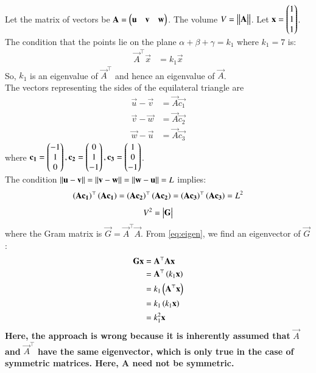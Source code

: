 \documentclass[journal]{IEEEtran}
\begin{document}
Let the matrix of vectors be $\mathbf{A} = \begin{pmatrix}\mathbf{u} & \mathbf{v} & \mathbf{w}\end{pmatrix}$. The volume $V = \left\vert\begin{vmatrix}\mathbf{A}\end{vmatrix}\right\vert$.
Let $\mathbf{x} = \begin{pmatrix}1 \\ 1 \\ 1\end{pmatrix}$. The condition that the points lie on the plane $\alpha+\beta+\gamma=k_1$ where $k_1=7$ is:
\begin{align}
    \vec{A}^\top\vec{x} &= k_1\vec{x} \label{eq:eigen}
\end{align}
So, $k_1$ is an eigenvalue of $\vec{A}^\top$ and hence an eigenvalue of $\vec{A}$. \\
The vectors representing the sides of the equilateral triangle are
\begin{align}
    \vec{u} - \vec{v} &= \vec{A}\vec{c_1} \label{eq:1} \\
    \vec{v} - \vec{w} &= \vec{A}\vec{c_2} \label{eq:2} \\
    \vec{w} - \vec{u} &= \vec{A}\vec{c_3} \label{eq:3}
\end{align}
where $\mathbf{c_1} = \begin{pmatrix}-1 \\ 1 \\ 0\end{pmatrix}, \mathbf{c_2} = \begin{pmatrix}0 \\ 1 \\ -1\end{pmatrix}, \mathbf{c_3} = \begin{pmatrix}1 \\ 0 \\ -1\end{pmatrix}$. \\
The condition $\left\lVert\mathbf{u} - \mathbf{v}\right\rVert = \left\lVert\mathbf{v} - \mathbf{w}\right\rVert = \left\lVert\mathbf{w} - \mathbf{u}\right\rVert = L$ implies:
\begin{align}
    \left(\mathbf{A}\mathbf{c_1}\right)^\top\left(\mathbf{A}\mathbf{c_1}\right) = \left(\mathbf{A}\mathbf{c_2}\right)^\top\left(\mathbf{A}\mathbf{c_2}\right) = \left(\mathbf{A}\mathbf{c_3}\right)^\top\left(\mathbf{A}\mathbf{c_3}\right) = L^2 \label{eq:gram}
\end{align}
\begin{align}
    V^2 = \begin{vmatrix}\mathbf{G}\end{vmatrix} 
\end{align}
where the Gram matrix is $\vec{G} = \vec{A}^\top\vec{A}$. From \eqref{eq:eigen}, we find an eigenvector of $\vec{G}$:
\begin{align}
    \mathbf{G}\mathbf{x} &= \mathbf{A}^\top\mathbf{A}\mathbf{x} \\
    &= \mathbf{A}^\top\left(k_1\mathbf{x}\right) \\
    &= k_1\left(\mathbf{A}^\top\mathbf{x}\right) \\
    &= k_1\left(k_1\mathbf{x}\right) \\
    &= k_1^2\mathbf{x}
\end{align}
\textbf{Here, the approach is wrong because it is inherently assumed that }$\vec{A}$\textbf{ and }$\vec{A}^\top$\textbf{ have the same eigenvector, which is only true in the case of symmetric matrices. Here, A need not be symmetric.}\\
\end{document}
